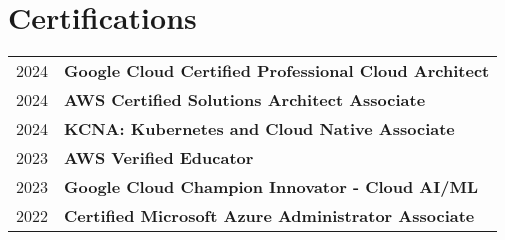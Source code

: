\documentclass[a4paper,11pt]{article}
\begin{document}
\section{Certifications}
\begin{tabularx}{\linewidth}{@{}l X@{}}	
2024 & \textbf{Google Cloud Certified Professional Cloud Architect} \\
2024 & \textbf{AWS Certified Solutions Architect Associate}  \\
2024 & \textbf{KCNA: Kubernetes and Cloud Native Associate}  \\ 
2023 & \textbf{AWS Verified Educator}  \\ 
2023 & \textbf{Google Cloud Champion Innovator - Cloud AI/ML}  \\ 
2022 & \textbf{Certified Microsoft Azure Administrator Associate}  \\ 


\end{tabularx}
\end{document}
